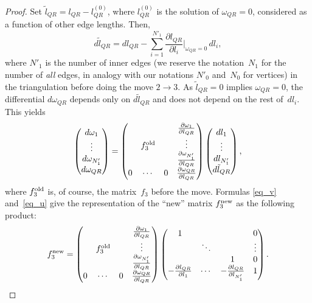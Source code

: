 \begin{proof}
Set $\tilde l_{QR} = l_{QR} - l^{(0)}_{QR}$, where $l^{(0)}_{QR}$ is the solution of $\omega_{QR} = 0$, considered as a function of other edge lengths. Then,
\begin{equation}
d\tilde l_{QR} = dl_{QR} - \sum\limits_{i=1}^{N'_1} \frac{\partial l_{QR}}{\partial l_i}{\Big|}_{\omega_{QR} = 0} \, dl_i,
\label{eq_u}
\end{equation}
where $N'_1$ is the number of inner edges (we reserve the notation~$N_1$ for the number of \emph{all} edges, in analogy with our notations $N'_0$ and~$N_0$ for vertices) in the triangulation before doing the move $2\to 3$. As $\tilde l_{QR}=0$ implies $\omega_{QR}=0$, the dif\/ferential $d\omega_{QR}$ depends only on $d\tilde l_{QR}$ and does not depend on the rest of~$dl_i$. This yields
\begin{equation}
\begin{pmatrix}
d\omega_1 \\
\vdots \\
d\omega_{N'_1} \\
d\omega_{QR}
\end{pmatrix} =
\begin{pmatrix}
{} & {} & {} & \frac{\partial\omega_1}{\partial l_{QR}} \\
{} & f_3^{\rm old} & {} & \vdots \\
{} & {} & {} & \frac{\partial\omega_{N'_1}}{\partial l_{QR}} \\
0 & \cdots & 0 & \frac{\partial\omega_{QR}}{\partial l_{QR}}
\end{pmatrix}
\begin{pmatrix}
dl_1 \\
\vdots \\
dl_{N'_1} \\
d\tilde l_{QR}
\end{pmatrix},
\label{eq_v}
\end{equation}
where $f_3^{\rm old}$ is, of course, the matrix~$f_3$ before the move. Formulas \eqref{eq_v} and~\eqref{eq_u} give the representation of the ``new'' matrix $f_3^{\rm new}$ as the following product:
\begin{equation*}
f_3^{\rm new} =
\begin{pmatrix}
{} & {} & {} & \frac{\partial\omega_1}{\partial l_{QR}} \\
{} & f_3^{\rm old} & {} & \vdots \\
{} & {} & {} & \frac{\partial\omega_{N'_1}}{\partial l_{QR}} \\
0 & \cdots & 0 & \frac{\partial\omega_{QR}}{\partial l_{QR}}
\end{pmatrix}
\begin{pmatrix}
1 & {} & {} & 0 \\
{} & \ddots & {} & \vdots \\
{} & {} & 1 & 0 \\
- \frac{\partial l_{QR}}{\partial l_1} & \cdots & - \frac{\partial l_{QR}}{\partial l_{N'_1}} & 1
\end{pmatrix}.
\end{equation*}


\end{proof}
